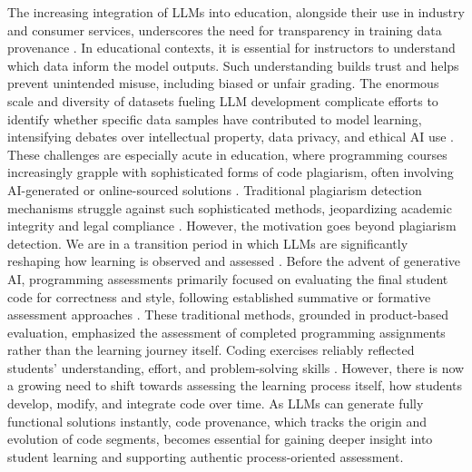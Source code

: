 \documentclass[runningheads]{llncs}
\begin{document}
The increasing integration of LLMs into education, alongside their use in industry and consumer services, underscores the need for transparency in training data provenance \cite{r5}. In educational contexts, it is essential for instructors to understand which data inform the model outputs. Such understanding builds trust and helps prevent unintended misuse, including biased or unfair
grading. The enormous scale and diversity of datasets fueling LLM development complicate efforts to identify whether specific data samples have contributed to model learning, intensifying debates over intellectual property, data privacy, and ethical AI use \cite{r9}. These challenges are especially acute in education, where programming courses increasingly grapple with sophisticated forms of code plagiarism, often involving AI-generated or online-sourced solutions \cite{r27}. Traditional plagiarism detection mechanisms struggle against such sophisticated methods, jeopardizing academic integrity and legal compliance \cite{r26}.  However, the motivation goes beyond plagiarism detection. We are in a transition period in which LLMs are significantly reshaping how learning is observed and assessed \cite{r5}. Before the advent of generative AI, programming assessments primarily focused on evaluating the final student code for correctness and style, following established summative or formative assessment approaches \cite{r42}. These traditional methods, grounded in product-based evaluation, emphasized the assessment of completed programming assignments rather than the learning journey itself. Coding exercises reliably reflected students' understanding, effort, and problem-solving skills \cite{r23}. However, there is now a growing need to shift towards assessing the learning process itself, how students develop, modify, and integrate code over time. As LLMs can generate fully functional solutions instantly, code provenance, which tracks the origin and evolution of code segments, becomes essential for gaining deeper insight into student learning and supporting authentic process-oriented assessment. 


\end{document}

